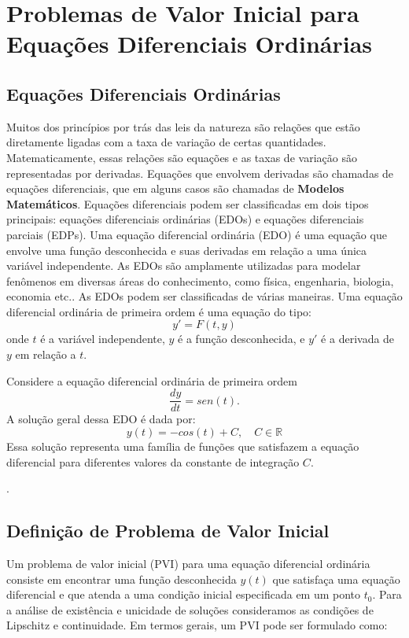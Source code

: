 \chapter{Problemas de Valor Inicial para Equações Diferenciais Ordinárias}

\section{Equações Diferenciais Ordinárias}
Muitos dos princípios por trás das leis da natureza são relações que estão
diretamente ligadas com a taxa de variação de certas quantidades.
Matematicamente, essas relações são equações e as taxas de variação são
representadas por derivadas. Equações que envolvem derivadas são chamadas de
equações diferenciais, que em alguns casos são chamadas de \textbf{Modelos
    Matemáticos}. Equações diferenciais podem ser classificadas em dois tipos
principais: equações diferenciais ordinárias (EDOs) e equações diferenciais
parciais (EDPs). Uma equação diferencial ordinária (EDO) é uma equação que
envolve uma função desconhecida e suas derivadas em relação a uma única
variável independente. As EDOs são amplamente utilizadas para modelar fenômenos
em diversas áreas do conhecimento, como física, engenharia, biologia, economia
etc.. As EDOs podem ser classificadas de várias maneiras. Uma equação
diferencial ordinária de primeira ordem é uma equação do tipo:
\begin{equation}
    y' = F\left(t, y\right)
\end{equation}
onde $t$ é a variável independente, $y$ é a função desconhecida, e
$y'$ é a derivada de $y$ em relação a $t$.

\begin{ex}
    Considere a equação diferencial ordinária de primeira ordem
    \begin{equation*}
        \frac{dy}{dt} = sen(t).
    \end{equation*}
    A solução geral dessa EDO é dada por:
    \begin{equation*}
        y(t) = -cos(t) + C, \quad C \in \mathbb{R}
    \end{equation*}
    Essa solução representa uma família de funções que satisfazem a equação diferencial para diferentes valores da constante de integração $C$.

    .
\end{ex}

\section{Definição de Problema de Valor Inicial}
Um problema de valor inicial (PVI) para uma equação diferencial ordinária
consiste em encontrar uma função desconhecida $y(t)$ que satisfaça uma equação
diferencial e que atenda a uma condição inicial especificada em um ponto $t_0$.
Para a análise de existência e unicidade de soluções consideramos as condições
de Lipschitz e continuidade. Em termos gerais, um PVI pode ser formulado como:

